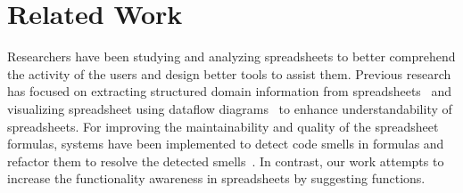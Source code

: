 \documentclass{article} %
\begin{document}





\section{Related Work}
Researchers have been studying and analyzing spreadsheets to better comprehend the activity of the users and design better tools to assist them. Previous research has focused on extracting structured domain information from spreadsheets~\cite{hermans2010automatically} and visualizing spreadsheet using dataflow diagrams~\cite{hermans2011breviz} to enhance understandability of spreadsheets. For improving the maintainability and quality of the spreadsheet formulas, systems have been implemented to detect code smells in formulas and refactor them to resolve the detected smells~\cite{hermans2014detecting}. In contrast, our work attempts to increase the functionality awareness in spreadsheets by suggesting functions.
\end{document}
